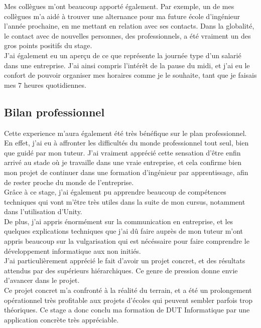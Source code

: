 \documentclass[a4paper]{article}
\begin{document}
        Mes collègues m'ont beaucoup apporté également. Par exemple, un de mes collègues m'a aidé à trouver une alternance pour ma future école d'ingénieur l'année prochaine, en me mettant en relation avec ses contacts. Dans la globalité, le contact avec de nouvelles personnes, des professionnels, a été vraiment un des gros points positifs du stage. \\

        J'ai également eu un aperçu de ce que représente la journée type d'un salarié dans une entreprise. J'ai ainsi compris l'intérêt de la pause du midi, et j'ai eu le confort de pouvoir organiser mes horaires comme je le souhaite, tant que je faisais mes 7 heures quotidiennes. \\

    \subsection{Bilan professionnel}

    Cette experience m'aura également été très bénéfique sur le plan professionnel. En effet, j'ai eu à affronter les difficultés du monde professionnel tout seul, bien que guidé par mon tuteur. J'ai vraiment apprécié cette sensation d'être enfin arrivé au stade où je travaille dans une vraie entreprise, et cela confirme bien mon projet de continuer dans une formation d'ingénieur par apprentissage, afin de rester proche du monde de l'entreprise. \\

    Grâce à ce stage, j'ai également pu apprendre beaucoup de compétences techniques qui vont m'être très utiles dans la suite de mon cursus, notamment dans l'utilisation d'Unity. \\ 

    De plus, j'ai appris énormément sur la communication en entreprise, et les quelques explications techniques que j'ai dû faire auprès de mon tuteur m'ont appris beaucoup sur la vulgarisation qui est nécéssaire pour faire comprendre le développement informatique aux non initiés. \\ 

    J'ai particulièrement apprécié le fait d'avoir un projet concret, et des résultats attendus par des supérieurs hiérarchiques. Ce genre de pression donne envie d'avancer dans le projet. \\
    
    Ce projet concret m'a confronté à la réalité du terrain, et a été un prolongement opérationnel très profitable aux projets d'écoles qui peuvent sembler parfois trop théoriques. Ce stage a donc conclu ma formation de DUT Informatique par une application concrète très appréciable. \\
\end{document}
